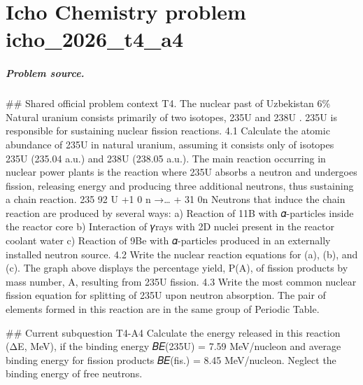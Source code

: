
\chapter{Icho Chemistry problem icho\_2026\_t4\_a4}
\label{ch:IChO2026Problems_problem_icho_2026_t4_a4}

\paragraph{Problem source.}
\#\# Shared official problem context
T4. The nuclear past of Uzbekistan 6\% Natural uranium consists primarily of two isotopes, 235U and 238U . 235U is responsible for sustaining nuclear fission reactions. 4.1 Calculate the atomic abundance of 235U in natural uranium, assuming it consists only of isotopes 235U (235.04 a.u.) and 238U (238.05 a.u.). The main reaction occurring in nuclear power plants is the reaction where 235U absorbs a neutron and undergoes fission, releasing energy and producing three additional neutrons, thus sustaining a chain reaction. 235 92 U +1 0 n →… + 31 0n Neutrons that induce the chain reaction are produced by several ways: a) Reaction of 11B with 𝛼-particles inside the reactor core b) Interaction of 𝛾rays with 2D nuclei present in the reactor coolant water c) Reaction of 9Be with 𝛼-particles produced in an externally installed neutron source. 4.2 Write the nuclear reaction equations for (a), (b), and (c). The graph above displays the percentage yield, P(A), of fission products by mass number, A, resulting from 235U fission. 4.3 Write the most common nuclear fission equation for splitting of 235U upon neutron absorption. The pair of elements formed in this reaction are in the same group of Periodic Table.

\#\# Current subquestion T4-A4
Calculate the energy released in this reaction (ΔE, MeV), if the binding energy 𝐵𝐸(235U) = 7.59 MeV/nucleon and average binding energy for fission products 𝐵𝐸(fis.) = 8.45 MeV/nucleon. Neglect the binding energy of free neutrons.

